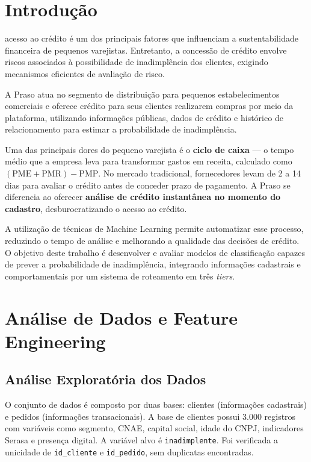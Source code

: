 \documentclass[conference]{IEEEtran}
\newcommand{\code}[1]{\texttt{#1}}
\begin{document}
\section{Introdução}

 acesso ao crédito é um dos principais fatores que influenciam a sustentabilidade financeira de pequenos varejistas. Entretanto, a concessão de crédito envolve riscos associados à possibilidade de inadimplência dos clientes, exigindo mecanismos eficientes de avaliação de risco.

A Praso atua no segmento de distribuição para pequenos estabelecimentos comerciais e oferece crédito para seus clientes realizarem compras por meio da plataforma, utilizando informações públicas, dados de crédito e histórico de relacionamento para estimar a probabilidade de inadimplência.

Uma das principais dores do pequeno varejista é o \textbf{ciclo de caixa} --- o tempo médio que a empresa leva para transformar gastos em receita, calculado como $(\mathrm{PME} + \mathrm{PMR}) - \mathrm{PMP}$. No mercado tradicional, fornecedores levam de 2 a 14 dias para avaliar o crédito antes de conceder prazo de pagamento. A Praso se diferencia ao oferecer \textbf{análise de crédito instantânea no momento do cadastro}, desburocratizando o acesso ao crédito.

A utilização de técnicas de Machine Learning permite automatizar esse processo, reduzindo o tempo de análise e melhorando a qualidade das decisões de crédito. O objetivo deste trabalho é desenvolver e avaliar modelos de classificação capazes de prever a probabilidade de inadimplência, integrando informações cadastrais e comportamentais por um sistema de roteamento em três \textit{tiers}.

\section{Análise de Dados e Feature Engineering}

\subsection{Análise Exploratória dos Dados}

O conjunto de dados é composto por duas bases: clientes (informações cadastrais) e pedidos (informações transacionais). A base de clientes possui 3.000 registros com variáveis como segmento, CNAE, capital social, idade do CNPJ, indicadores Serasa e presença digital. A variável alvo é \code{inadimplente}. Foi verificada a unicidade de \code{id\_cliente} e \code{id\_pedido}, sem duplicatas encontradas.
\end{document}
